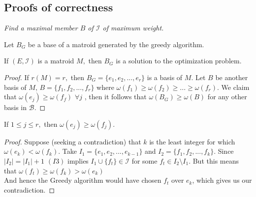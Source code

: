 \documentclass[../main.tex]{subfiles}
\begin{document}
\subsection{Proofs of correctness}
\noindent\Problem \textit{Find a maximal member $B$ of $\mathcal{I}$ of maximum weight.}
\begin{note}
Let $B_G$ be a base of a matroid generated by the greedy algorithm.
\end{note}
\begin{thm}
If $(E,\mathcal{I})$ is a matroid $M,$ then $B_G$ is a solution to the optimization problem.
\end{thm}
\begin{proof}
If $r(M) = r,$ then $B_G = \{e_1,e_2, ..., e_r\}$ is a basis of $M.$ Let $B$ be another basis of $M$, $B = \{f_1, f_2, ..., f_r\}$
where $\omega(f_1) \geq \omega(f_2) \geq ... \geq \omega(f_r).$ We claim that $\omega(e_j) \geq \omega(f_f)$ $ \forall j$ , then it follows that $\omega(B_G) \geq \omega(B)$ for any other basis in $\mathcal{B}.$
\end{proof}

\begin{lem}
If $1 \leq j \leq r,$ then $\omega(e_j) \geq \omega(f_j).$
\end{lem}
\begin{proof}
Suppose (seeking a contradiction) that $k$ is the least integer for which $\omega(e_k) < \omega(f_k).$ Take $I_1 = \{e_1, e_2, ..., e_{k-1}\}$ and $I_2 = \{f_1, f_2, ..., f_{k}\}.$ Since $|I_2| = |I_1|+1$  $(I3)$ implies $I_1 \cup \{f_t\} \in \mathcal{I}$ for some $f_t \in I_2 \setminus I_1.$ But this means that $\omega(f_t) \geq \omega(f_k) > \omega(e_k)$\\ And hence the Greedy algorithm would have chosen $f_t$ over $e_k$, which gives us our contradiction.
\end{proof}
\end{document}
